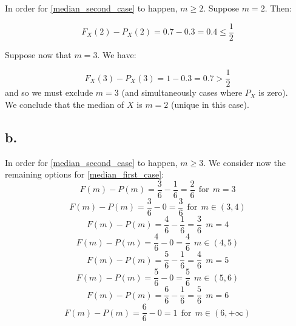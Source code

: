 \documentclass{article}
\begin{document}
In order for \eqref{median_second_case} to happen, \(m \geq 2\). Suppose \(m = 2\). Then:

\begin{equation*}
    F_{X}(2) - P_{X}(2) = 0.7 - 0.3 = 0.4 \leq \frac{1}{2}
\end{equation*}

Suppose now that \(m = 3\). We have:

\begin{equation*}
    F_{X}(3) - P_{X}(3) = 1 - 0.3 = 0.7 > \frac{1}{2}
\end{equation*}
and so we must exclude \(m = 3\) (and simultaneously cases where \(P_{X}\) is zero).
\\
We conclude that the median of \(X\) is \(m = 2\) (unique in this case).


\subsection*{b.}

In order for \eqref{median_second_case} to happen, \(m \geq 3\). We consider now the remaining options for \eqref{median_first_case}:
\begin{equation*}
    F(m) - P(m) = \frac{3}{6} - \frac{1}{6} = \frac{2}{6} \ \ \mbox{for} \ \ m = 3 
\end{equation*}
\begin{equation*}
    F(m) - P(m) = \frac{3}{6} - 0 = \frac{3}{6} \ \ \mbox{for} \ \ m \in (3, 4)
\end{equation*}
\begin{equation*}
    F(m) - P(m) = \frac{4}{6} - \frac{1}{6} = \frac{3}{6} \ \ m = 4
\end{equation*}
\begin{equation*}
    F(m) - P(m) = \frac{4}{6} - 0 = \frac{4}{6} \ \ m \in (4, 5)
\end{equation*}
\begin{equation*}
    F(m) - P(m) = \frac{5}{6} - \frac{1}{6} = \frac{4}{6} \ \ m = 5
\end{equation*}
\begin{equation*}
    F(m) - P(m) = \frac{5}{6} - 0 = \frac{5}{6} \ \ m \in (5, 6)
\end{equation*}
\begin{equation*}
    F(m) - P(m) = \frac{6}{6} - \frac{1}{6} = \frac{5}{6} \ \ m = 6
\end{equation*}
\begin{equation*}
    F(m) - P(m) = \frac{6}{6} - 0 = 1 \ \ \mbox{for} \ \ m \in (6, + \infty)
\end{equation*}
\end{document}
